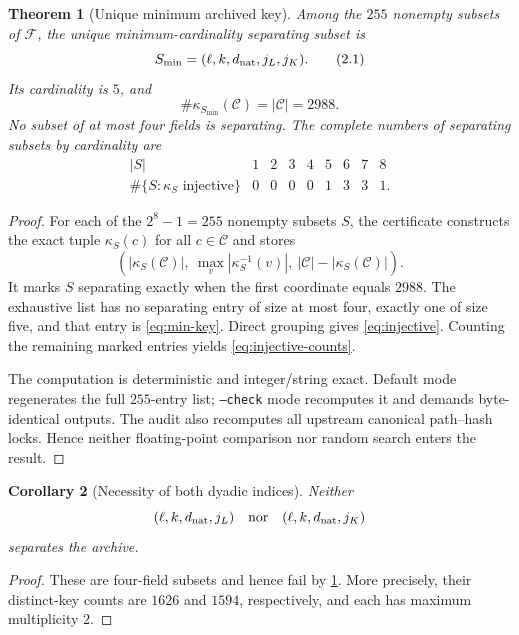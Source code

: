 \documentclass[11pt]{article}
\newtheorem{theorem}{Theorem}[section]
\newtheorem{corollary}[theorem]{Corollary}
\theoremstyle{definition}
\theoremstyle{remark}
\newcommand{\Fdict}{\mathcal F}
\begin{document}
\begin{theorem}[Unique minimum archived key]\label{thm:minimal-key}
Among the \(255\) nonempty subsets of \(\Fdict\), the unique
minimum-cardinality separating subset is
\[
 S_{\min}=(\ell,k,d_{\rm nat},j_L,j_K).
 \tag{2.1}\label{eq:min-key}
\]
Its cardinality is \(5\), and
\[
 \#\kappa_{S_{\min}}(\mathcal C)=|\mathcal C|=2988.
 \tag{2.2}\label{eq:injective}
\]
No subset of at most four fields is separating.  The complete numbers
of separating subsets by cardinality are
\[
\begin{array}{c|rrrrrrrr}
 |S|&1&2&3&4&5&6&7&8\\
\hline
 \#\{S:\kappa_S\text{ injective}\}&0&0&0&0&1&3&3&1.
\end{array}
\tag{2.3}\label{eq:injective-counts}
\]
\end{theorem}

\begin{proof}
For each of the \(2^8-1=255\) nonempty subsets \(S\), the certificate
constructs the exact tuple \(\kappa_S(c)\) for all \(c\in\mathcal C\)
and stores
\[
 \left(
   |\kappa_S(\mathcal C)|,\ 
   \max_v|\kappa_S^{-1}(v)|,\ 
   |\mathcal C|-|\kappa_S(\mathcal C)|
 \right).
 \tag{2.4}\label{eq:stats}
\]
It marks \(S\) separating exactly when the first coordinate equals
\(2988\).  The exhaustive list has no separating entry of size at
most four, exactly one of size five, and that entry is
\eqref{eq:min-key}.  Direct grouping gives \eqref{eq:injective}.
Counting the remaining marked entries yields
\eqref{eq:injective-counts}.

The computation is deterministic and integer/string exact.  Default
mode regenerates the full \(255\)-entry list; \texttt{--check} mode
recomputes it and demands byte-identical outputs.  The audit also
recomputes all upstream canonical path--hash locks.  Hence neither
floating-point comparison nor random search enters the result.
\end{proof}

\begin{corollary}[Necessity of both dyadic indices]\label{cor:both}
Neither
\[
 (\ell,k,d_{\rm nat},j_L)
 \quad\text{nor}\quad
 (\ell,k,d_{\rm nat},j_K)
\]
separates the archive.
\end{corollary}

\begin{proof}
These are four-field subsets and hence fail by
\cref{thm:minimal-key}.  More precisely, their distinct-key counts are
\(1626\) and \(1594\), respectively, and each has maximum
multiplicity \(2\).
\end{proof}
\end{document}
